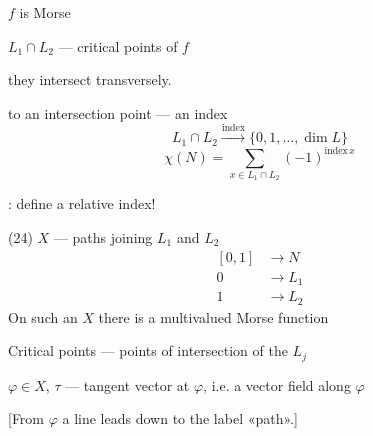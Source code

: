 \(f\) is Morse

\(L_1\cap L_2\) — critical points of \(f\)

they intersect transversely.

to an intersection point — an index
\[
L_1\cap L_2\xrightarrow{\mathrm{index}}\{0,1,\ldots,\dim L\}
\]
\begin{equation*}
\chi(N)=\sum_{x\in L_1\cap L_2}(-1)^{\mathrm{index}\,x}
\tag{23}
\end{equation*}

: define a relative index!

(24) \(X\) — paths joining \(L_1\) and \(L_2\)
\[
\begin{aligned}
{}[0,1]&\longrightarrow N\\
0&\longrightarrow L_1\\
1&\longrightarrow L_2
\end{aligned}
\]
On such an \(X\) there is a multivalued Morse function

Critical points — points of intersection of the \(L_j\)

\(\varphi\in X\), \(\tau\) — tangent vector at \(\varphi\), i.e. a vector field along \(\varphi\)

[From \(\varphi\) a line leads down to the label «path».]


